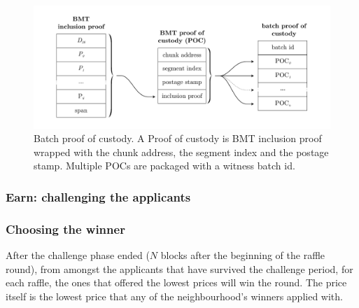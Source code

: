 \begin{figure}[htbp]
  \centering
   \includegraphics[width=\textwidth]{fig/batch-proof-of-custody.pdf}
  \caption[Batch proof of custody \statusgreen]{Batch proof of custody. A Proof of custody is BMT inclusion proof wrapped with the chunk address, the segment index and the postage stamp. Multiple POCs are packaged with a witness batch id.}
  \label{fig:batch-proof-of-custody}
\end{figure}

\subsubsection{Earn: challenging the applicants}


\subsubsection{Choosing the winner}

After the challenge phase ended ($N$ blocks after the beginning of the raffle round), from amongst the applicants that have survived the challenge period, for each raffle, the ones that offered the lowest prices will win the round. The  price itself is the lowest price that any of the neighbourhood's winners applied with.

